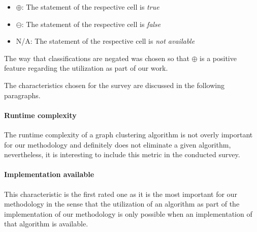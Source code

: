 \documentclass[12pt,a4paper]{report}
\begin{document}
\begin{table}[ht!]
{  \begin{itemize}[noitemsep]
    \item $\oplus$: The statement of the respective cell is \textit{true}
    \item $\ominus$: The statement of the respective cell is \textit{false}
    \item N/A: The statement of the respective cell is \textit{not available}
  \end{itemize}
  The way that classifications are negated was chosen so that $\oplus$
  is a positive feature regarding the utilization as part of our work.
}
\label{table:graph-clustering-survey}
\end{table}

The characteristics chosen for the survey are discussed in the following paragraphs.

\paragraph{Runtime complexity}
The runtime complexity of a graph clustering algorithm is not overly
important for our methodology and definitely does not eliminate a given algorithm,
nevertheless, it is interesting to include this metric in the conducted survey.

\paragraph{Implementation available}
This characteristic is the first rated one as it is the most important for our
methodology in the sense that the utilization of an algorithm as part of
the implementation of our methodology is only possible when an implementation
of that algorithm is available.
\end{document}
